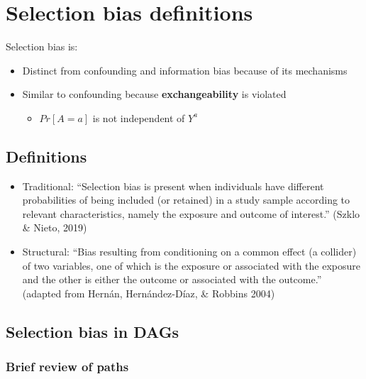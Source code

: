 \documentclass[
]{book}
\providecommand{\tightlist}{%
  \setlength{\itemsep}{0pt}\setlength{\parskip}{0pt}}
\begin{document}
\hypertarget{selection-bias-definitions}{%
\section{Selection bias definitions}\label{selection-bias-definitions}}

Selection bias is:

\begin{itemize}
\tightlist
\item
  Distinct from confounding and information bias because of its mechanisms
\item
  Similar to confounding because \textbf{exchangeability} is violated

  \begin{itemize}
  \tightlist
  \item
    \(Pr[A=a]\) is not independent of \(Y^a\)
  \end{itemize}
\end{itemize}

\hypertarget{definitions}{%
\subsection{Definitions}\label{definitions}}

\begin{itemize}
\tightlist
\item
  Traditional: ``Selection bias is present when individuals have different probabilities of being included (or retained) in a study sample according to relevant characteristics, namely the exposure and outcome of interest.'' (Szklo \& Nieto, 2019)
\item
  Structural: ``Bias resulting from conditioning on a common effect (a collider) of two variables, one of which is the exposure or associated with the exposure and the other is either the outcome or associated with the outcome.'' (adapted from Hernán, Hernández-Díaz, \& Robbins 2004)
\end{itemize}

\hypertarget{selection-bias-in-dags}{%
\subsection{Selection bias in DAGs}\label{selection-bias-in-dags}}

\hypertarget{brief-review-of-paths}{%
\subsubsection{Brief review of paths}\label{brief-review-of-paths}}
\end{document}
